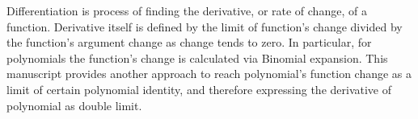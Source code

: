 Differentiation is process of finding the derivative, or rate of change, of a function.
Derivative itself is defined by the limit of function's change divided by the function's argument change
as change tends to zero.
In particular, for polynomials the function's change is calculated via Binomial expansion.
This manuscript provides another approach to reach polynomial's function change as a limit of certain polynomial identity,
and therefore expressing the derivative of polynomial as double limit.
